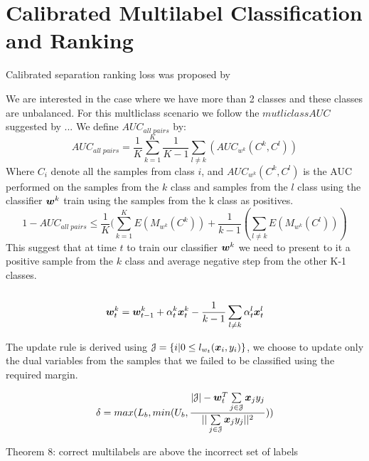 \section{Calibrated Multilabel Classification and Ranking}

Calibrated separation ranking loss was proposed by \cite{GuoShuurmans11}

We are interested in the case where we have more than 2 classes and these classes are unbalanced. For this multliclass scenario we follow the $mutliclass AUC$ suggested by ... 
We define $AUC_{all \; pairs}$ by:
\[
	AUC_{all \; pairs} = \frac{1}{K} \sum\limits_{k=1}^{K}  \frac{1}{K-1}\sum\limits_{l \neq k} (AUC_{w^k}(C^k, C^l)) 
\]
Where $C_i$ denote all the samples from class $i$, and $AUC_{w^k}(C^k, C^l)$ is the AUC performed on the samples from the $k$ class and samples from the $l$ class using the classifier $ \bm{w}^k $ train using the samples from the k class as positives.
\[
1 - AUC_{all \; pairs} \leq \frac{1}{K} ( \sum\limits_{k=1}^{K} E(M_{w^k}(C^k)) + \frac{1}{k-1} ( \sum\limits_{l \neq k}  E(M_{w^k}(C^l)) )
\]
This suggest that at time $t$ to train our classifier $\bm{w}^k $ we need to present to it a positive sample from the $k$ class and average negative step from the other K-1 classes.\\
\\
\[
  \bm{w}^k_t = \bm{w}^k_{t-1} + \alpha^k_t \bm{x}^k_t - \frac{1}{k-1}\sum\limits_{l \neq k} \alpha^l_t \bm{x}^l_t
\]


The update rule is derived using $\mathcal{J} = \{ i | 0 \leq l_{w_t}(\bm{x}_i, y_i) \}$, we choose to update only the dual variables from the samples that we failed to be classified using the required margin.

\[ \delta = max(L_b   , min(U_b , \frac{|\mathcal{J}| - \bm{w}_t^T \sum\limits_{j \in \mathcal{J}} {\bm{x}_j y_j}   }{|| \sum\limits_{j \in \mathcal{J} }{\bm{x}_j y_j} ||^2 }  ) )
\]

Theorem 8: correct multilabels are above the incorrect set of labels
